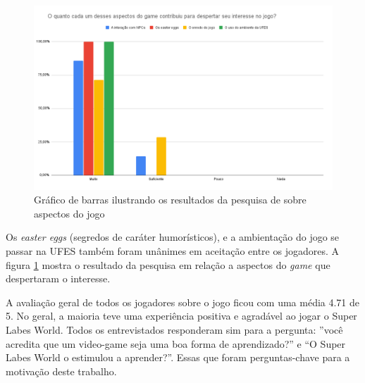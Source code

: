 \begin{figure}[h!]
    \centering
    \includegraphics[width=1\linewidth]{figuras/graph-3.png}
    \caption{Gráfico de barras ilustrando os resultados da pesquisa de sobre aspectos do jogo}
    \label{fig:graph-3}
\end{figure}

Os \textit{easter eggs} (segredos de caráter humorísticos), e a ambientação do jogo se passar na UFES também foram unânimes em aceitação entre os jogadores. A figura \ref{fig:graph-3} mostra o resultado da pesquisa em relação a aspectos do \textit{game} que despertaram o interesse. 

\clearpage
A avaliação geral de todos os jogadores sobre o jogo ficou com uma média 4.71 de 5. No geral, a maioria teve uma experiência positiva e agradável ao jogar o Super Labes World. Todos os entrevistados responderam sim para a pergunta: ''você acredita que um video-game seja uma boa forma de aprendizado?'' e ``O Super Labes World o estimulou a aprender?''. Essas que foram perguntas-chave para a motivação deste trabalho. 

